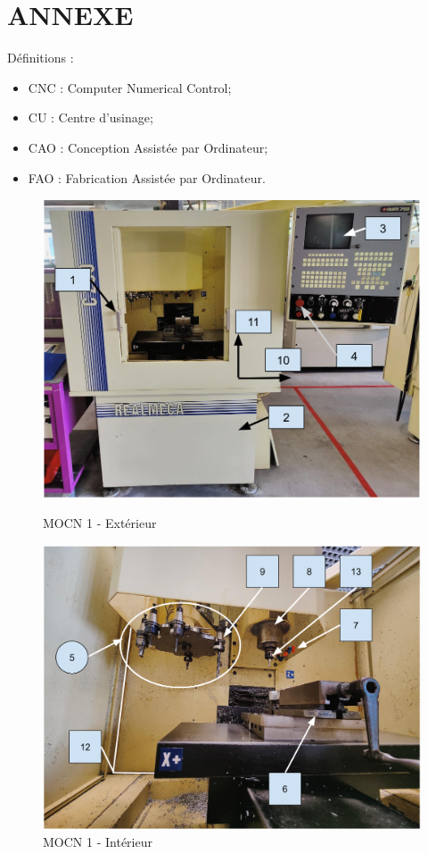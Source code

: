 \documentclass[12pt]{article}
\begin{document}

\newpage


\section{ANNEXE}
Définitions :
\begin{itemize}
    \item CNC : Computer Numerical Control;
    \item CU : Centre d'usinage;
    \item CAO : Conception Assistée par Ordinateur;
    \item FAO : Fabrication Assistée par Ordinateur.
\end{itemize}



\begin{figure}
\centering
\includegraphics[width=0.7\linewidth]{MOCN11.PNG}
\caption{MOCN 1 - Extérieur}
\label{MOCN11}


\centering
\includegraphics[width=0.7\linewidth]{MOCN12.PNG}
\caption{MOCN 1 - Intérieur}
\label{MOCN12}
\end{figure}
\end{document}
